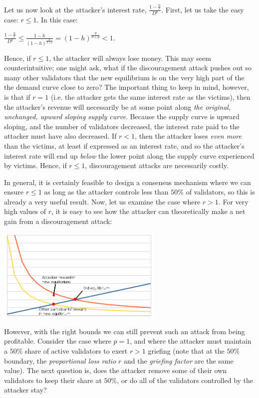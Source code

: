 \documentclass[12pt]{article}
\begin{document}
Let us now look at the attacker's interest rate, $\frac{1-\frac{h}{r}}{D^p}$. First, let us take the easy case: $r \le 1$. In this case:

$\frac{1-\frac{h}{r}}{D^p} \le \frac{1-h}{(1-h)^{\frac{p}{d+p}}} = (1-h)^{\frac{d}{d+p}} < 1$.

Hence, if $r \le 1$, the attacker will always lose money. This may seem counterintuitive; one might ask, what if the discouragement attack pushes out so many other validators that the new equilibrium is on the very high part of the the demand curve close to zero? The important thing to keep in mind, however, is that if $r = 1$ (i.e. the attacker gets the same interest rate as the victims), then the attacker's revenue will necessarily be at some point along \textit{the original, unchanged, upward sloping supply curve}. Because the supply curve is upward sloping, and the number of validators decreased, the interest rate paid to the attacker must have also decreased. If $r < 1$, then the attacker loses \textit{even more} than the victims, at least if expressed as an interest rate, and so the attacker's interest rate will end up \textit{below} the lower point along the supply curve experienced by victims. Hence, if $r \le 1$, discouragement attacks are necessarily costly.

In general, it is certainly feasible to design a consensus mechanism where we can ensure $r \le 1$ as long as the attacker controls less than $50\%$ of validators, so this is already a very useful result. Now, let us examine the case where $r > 1$. For very high values of $r$, it is easy to see how the attacker can theoretically make a net gain from a discouragement attack:

\includegraphics[width=300px]{disc_chart3.png}



However, with the right bounds we can still prevent such an attack from being profitable. Consider the case where $p=1$, and where the attacker must maintain a $50\%$ share of active validators to exert $r > 1$ griefing (note that at the $50\%$ boundary, the \textit{proportional loss ratio} $r$ and the \textit{griefing factor} are the same value). The next question is, does the attacker remove some of their own validators to keep their share at $50\%$, or do all of the validators controlled by the attacker stay?
\end{document}
